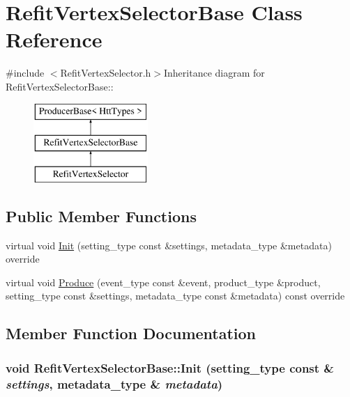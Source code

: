 \hypertarget{classRefitVertexSelectorBase}{
\section{RefitVertexSelectorBase Class Reference}
\label{classRefitVertexSelectorBase}
}


{\ttfamily \#include $<$RefitVertexSelector.h$>$}Inheritance diagram for RefitVertexSelectorBase::\begin{figure}[H]
\begin{center}
\leavevmode
\includegraphics[height=3cm]{classRefitVertexSelectorBase}
\end{center}
\end{figure}
\subsection*{Public Member Functions}
\begin{DoxyCompactItemize}
\item 
virtual void \hyperlink{classRefitVertexSelectorBase_aaa721c9601071abe89d6f866d5405c01}{Init} (setting\_\-type const \&settings, metadata\_\-type \&metadata) override
\item 
virtual void \hyperlink{classRefitVertexSelectorBase_a77253bf070f364ed29d8f040a2dd1629}{Produce} (event\_\-type const \&event, product\_\-type \&product, setting\_\-type const \&settings, metadata\_\-type const \&metadata) const override
\end{DoxyCompactItemize}


\subsection{Member Function Documentation}
\hypertarget{classRefitVertexSelectorBase_aaa721c9601071abe89d6f866d5405c01}{
\subsubsection[{Init}]{\setlength{\rightskip}{0pt plus 5cm}void RefitVertexSelectorBase::Init (setting\_\-type const \& {\em settings}, \/  metadata\_\-type \& {\em metadata})}}
\label{classRefitVertexSelectorBase_aaa721c9601071abe89d6f866d5405c01}


